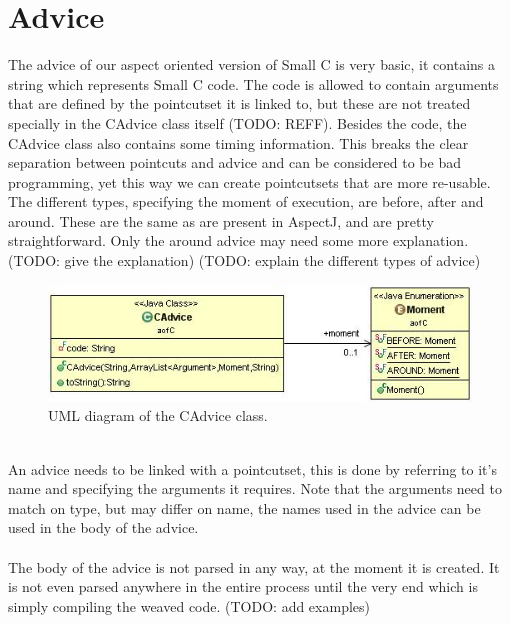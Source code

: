 \documentclass[a4paper]{report}
\begin{document}
\section{Advice}
The advice of our aspect oriented version of Small C is very basic, it contains a string which represents Small C code. The code is allowed to contain arguments that are defined by the pointcutset it is linked to, but these are not treated specially in the CAdvice class itself (TODO: REFF). Besides the code, the CAdvice class also contains some timing information. This breaks the clear separation between pointcuts and advice and can be considered to be bad programming, yet this way we can create pointcutsets that are more re-usable. The different types, specifying the moment of execution, are before, after and around. These are the same as are present in AspectJ, and are pretty straightforward. Only the around advice may need some more explanation. (TODO: give the explanation) (TODO: explain the different types of advice)\\
\begin{figure}
\centering
\includegraphics[scale=0.7]{images/AOFC/CAdvice.jpg}
\caption{UML diagram of the CAdvice class.}
\label{fig:CAdvice}
\end{figure}
\\
An advice needs to be linked with a pointcutset, this is done by referring to it's name and specifying the arguments it requires. Note that the arguments need to match on type, but may differ on name, the names used in the advice can be used in the body of the advice.\\
\\
The body of the advice is not parsed in any way, at the moment it is created. It is not even parsed anywhere in the entire process until the very end which is simply compiling the weaved code. (TODO: add examples)
\end{document}
